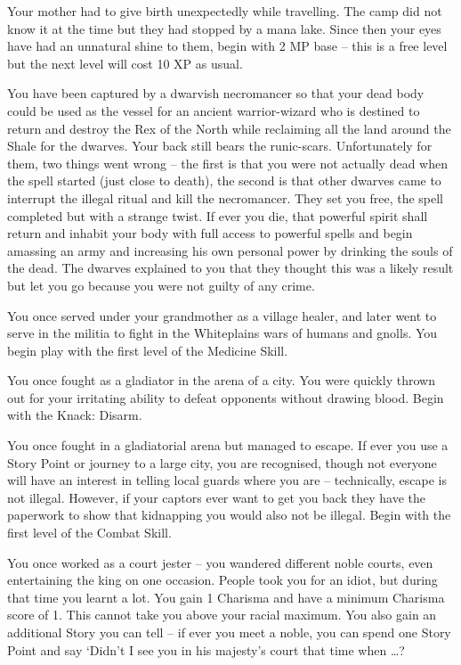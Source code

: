 \begin{multicols}{2}
\begin{list}{\addtocounter{list}{1}\textbf{:}}{\raggedleft}
  \item
  Your mother had to give birth unexpectedly while travelling.
  The camp did not know it at the time but they had stopped by a mana lake.
  Since then your eyes have had an unnatural shine to them, begin with 2 MP base -- this is a free level but the next level will cost 10 XP as usual.

  \item
  You have been captured by a dwarvish necromancer so that your dead body could be used as the vessel for an ancient warrior-wizard who is destined to return and destroy the Rex of the North while reclaiming all the land around the Shale for the dwarves.
  Your back still bears the runic-scars.
  Unfortunately for them, two things went wrong -- the first is that you were not actually dead when the spell started (just close to death), the second is that other dwarves came to interrupt the illegal ritual and kill the necromancer.
  They set you free, the spell completed but with a strange twist.
  If ever you die, that powerful spirit shall return and inhabit your body with full access to powerful spells and begin amassing an army and increasing his own personal power by drinking the souls of the dead.
  The dwarves explained to you that they thought this was a likely result but let you go because you were not guilty of any crime.

  \item
  You once served under your grandmother as a village healer, and later went to serve in the militia to fight in the Whiteplains wars of humans and gnolls.
You begin play with the first level of the Medicine Skill. 

  \item
  You once fought as a gladiator in the arena of a city.
  You were quickly thrown out for your irritating ability to defeat opponents without drawing blood.
  Begin with the Knack: Disarm.

  \item
  You once fought in a gladiatorial arena but managed to escape.
  If ever you use a Story Point or journey to a large city, you are recognised, though not everyone will have an interest in telling local guards where you are -- technically, escape is not illegal.
  However, if your captors ever want to get you back they have the paperwork to show that kidnapping you would also not be illegal.
  Begin with the first level of the Combat Skill. 

  \item
  You once worked as a court jester -- you wandered different noble courts, even entertaining the king on one occasion.
  People took you for an idiot, but during that time you learnt a lot.
  You gain 1 Charisma and have a minimum Charisma score of 1.
  This cannot take you above your racial maximum.
  You also gain an additional Story you can tell -- if ever you meet a noble, you can spend one Story Point and say `Didn't I see you in his majesty's court that time when \ldots ?


\end{list}
\end{multicols}
